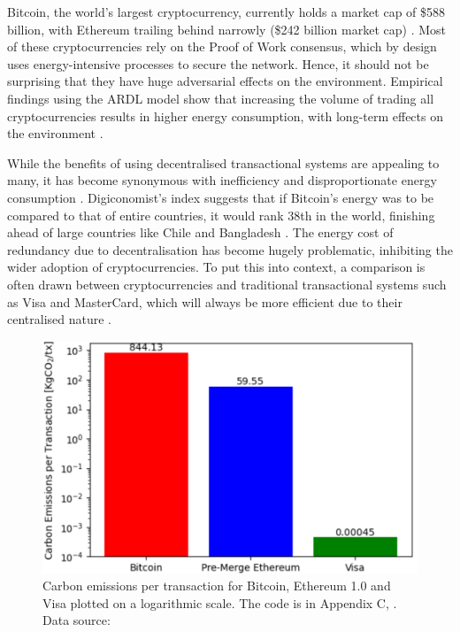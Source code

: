Bitcoin, the world's largest cryptocurrency, currently holds a market cap of \$588 billion, with Ethereum trailing behind narrowly (\$242 billion market cap) \cite{BitcoinCoinMarketCap}. Most of these cryptocurrencies rely on the Proof of Work consensus, which by design uses energy-intensive processes to secure the network. Hence, it should not be surprising that they have huge adversarial effects on the environment. Empirical findings using the ARDL model show that increasing the volume of trading all cryptocurrencies results in higher energy consumption, with long-term effects on the environment \cite{Schinckus2020Crypto-currenciesConsumption}. \newline 

While the benefits of using decentralised transactional systems are appealing to many, it has become synonymous with inefficiency and disproportionate energy consumption \cite{DeVriesBitcoinsProblem}. Digiconomist's index suggests that if Bitcoin's energy was to be compared to that of entire countries, it would rank 38th in the world, finishing ahead of large countries like Chile and Bangladesh \cite{BitcoinDigiconomist}. The energy cost of redundancy due to decentralisation has become hugely problematic, inhibiting the wider adoption of cryptocurrencies. To put this into context, a comparison is often drawn between cryptocurrencies and traditional transactional systems such as Visa and MasterCard, which will always be more efficient due to their centralised nature \cite{Kohli2023AnSolutions}.  

\begin{figure}[h]
    \centering
    \includegraphics[width=13cm,center]{Figures/CarbonEmissionsPlot.png}
    \caption{Carbon emissions per transaction for Bitcoin, Ethereum 1.0 and Visa plotted on a logarithmic scale. The code is in Appendix C, . Data source: \cite{Kohli2023AnSolutions} }
    \label{Figure:CarbonEmissionsPlot}
\end{figure}

